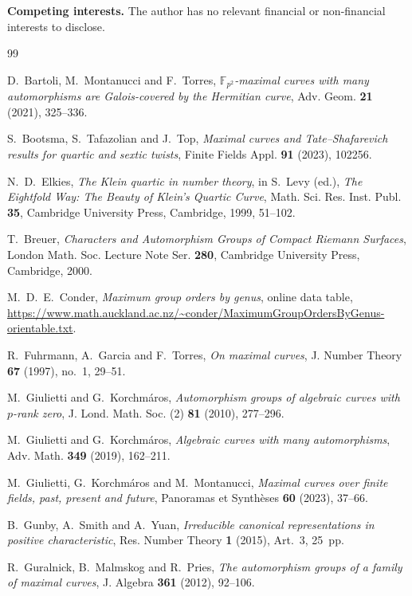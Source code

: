 \documentclass[11pt]{amsart}
\theoremstyle{remark}
\newcommand{\F}{\mathbb F}
\begin{document}
\textbf{Competing interests.}
The author has no relevant financial or non-financial interests to
disclose.

\begin{thebibliography}{99}

D.~Bartoli, M.~Montanucci and F.~Torres,
\emph{$\F_{p^2}$-maximal curves with many automorphisms are
Galois-covered by the Hermitian curve},
Adv. Geom. \textbf{21} (2021), 325--336.

S.~Bootsma, S.~Tafazolian and J.~Top,
\emph{Maximal curves and Tate--Shafarevich results for quartic and
sextic twists},
Finite Fields Appl. \textbf{91} (2023), 102256.

N.~D.~Elkies,
\emph{The Klein quartic in number theory},
in S.~Levy (ed.), \emph{The Eightfold Way: The Beauty of Klein's
Quartic Curve}, Math. Sci. Res. Inst. Publ. \textbf{35},
Cambridge University Press, Cambridge, 1999, 51--102.

T.~Breuer,
\emph{Characters and Automorphism Groups of Compact Riemann Surfaces},
London Math. Soc. Lecture Note Ser. \textbf{280},
Cambridge University Press, Cambridge, 2000.

M.~D.~E.~Conder,
\emph{Maximum group orders by genus}, online data table,
\url{https://www.math.auckland.ac.nz/~conder/MaximumGroupOrdersByGenus-orientable.txt}.

R.~Fuhrmann, A.~Garcia and F.~Torres,
\emph{On maximal curves},
J. Number Theory \textbf{67} (1997), no.~1, 29--51.

M.~Giulietti and G.~Korchm\'aros,
\emph{Automorphism groups of algebraic curves with $p$-rank zero},
J. Lond. Math. Soc. (2) \textbf{81} (2010), 277--296.

M.~Giulietti and G.~Korchm\'aros,
\emph{Algebraic curves with many automorphisms},
Adv. Math. \textbf{349} (2019), 162--211.

M.~Giulietti, G.~Korchm\'aros and M.~Montanucci,
\emph{Maximal curves over finite fields, past, present and future},
Panoramas et Synth\`eses \textbf{60} (2023), 37--66.

B.~Gunby, A.~Smith and A.~Yuan,
\emph{Irreducible canonical representations in positive characteristic},
Res. Number Theory \textbf{1} (2015), Art.~3, 25~pp.

R.~Guralnick, B.~Malmskog and R.~Pries,
\emph{The automorphism groups of a family of maximal curves},
J. Algebra \textbf{361} (2012), 92--106.


\end{thebibliography}
\end{document}
